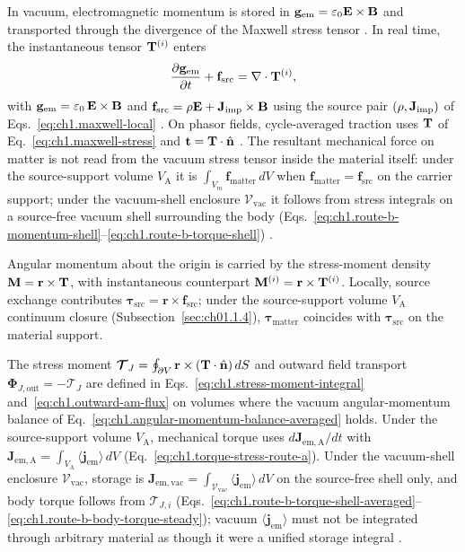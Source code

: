 In vacuum, electromagnetic momentum is stored in $\mathbf{g}_{\mathrm{em}}=\varepsilon_0\mathbf{E}\times\mathbf{B}$ and transported through the divergence of the Maxwell stress tensor \cite{maxwell1873,stratton1941}. In real time, the instantaneous tensor $\mathbf{T}^{(i)}$ enters
\begin{equation}
\label{eq:ch1.intro-momentum-balance}
\frac{\partial\mathbf{g}_{\mathrm{em}}}{\partial t}+\mathbf{f}_{\mathrm{src}}
=\nabla\cdot\mathbf{T}^{(i)},
\end{equation}
with $\mathbf{g}_{\mathrm{em}}=\varepsilon_0\,\mathbf{E}\times\mathbf{B}$ and $\mathbf{f}_{\mathrm{src}}=\rho\mathbf{E}+\mathbf{J}_{\mathrm{imp}}\times\mathbf{B}$ using the source pair $(\rho,\mathbf{J}_{\mathrm{imp}})$ of Eqs.~\eqref{eq:ch1.maxwell-local} \cite{maxwell1873,stratton1941}. On phasor fields, cycle-averaged traction uses $\mathbf{T}$ of Eq.~\eqref{eq:ch1.maxwell-stress} and $\mathbf{t}=\mathbf{T}\cdot\hat{\mathbf{n}}$ \cite{stratton1941}. The resultant mechanical force on matter is not read from the vacuum stress tensor inside the material itself: under the source-support volume $V_{\mathrm{A}}$ it is $\int_{V_m}\mathbf{f}_{\mathrm{matter}}\,dV$ when $\mathbf{f}_{\mathrm{matter}}=\mathbf{f}_{\mathrm{src}}$ on the carrier support; under the vacuum-shell enclosure $\mathcal{V}_{\mathrm{vac}}$ it follows from stress integrals on a source-free vacuum shell surrounding the body (Eqs.~\eqref{eq:ch1.route-b-momentum-shell}--\eqref{eq:ch1.route-b-torque-shell}) \cite{stratton1941,harrington2001}.

Angular momentum about the origin is carried by the stress-moment density $\mathbf{M}=\mathbf{r}\times\mathbf{T}$, with instantaneous counterpart $\mathbf{M}^{(i)}=\mathbf{r}\times\mathbf{T}^{(i)}$. Locally, source exchange contributes $\boldsymbol{\tau}_{\mathrm{src}}=\mathbf{r}\times\mathbf{f}_{\mathrm{src}}$; under the source-support volume $V_{\mathrm{A}}$ continuum closure (Subsection~\ref{sec:ch01.1.4}), $\boldsymbol{\tau}_{\mathrm{matter}}$ coincides with $\boldsymbol{\tau}_{\mathrm{src}}$ on the material support.

The stress moment $\boldsymbol{\mathcal{T}}_J=\oint_{\partial V}\mathbf{r}\times(\mathbf{T}\cdot\hat{\mathbf{n}})\,dS$ and outward field transport $\boldsymbol{\Phi}_{J,\mathrm{out}}=-\boldsymbol{\mathcal{T}}_J$ are defined in Eqs.~\eqref{eq:ch1.stress-moment-integral} and~\eqref{eq:ch1.outward-am-flux} on volumes where the vacuum angular-momentum balance of Eq.~\eqref{eq:ch1.angular-momentum-balance-averaged} holds. Under the source-support volume $V_{\mathrm{A}}$, mechanical torque uses $d\mathbf{J}_{\mathrm{em,A}}/dt$ with $\mathbf{J}_{\mathrm{em,A}}=\int_{V_{\mathrm{A}}}\langle\mathbf{j}_{\mathrm{em}}\rangle\,dV$ (Eq.~\eqref{eq:ch1.torque-stress-route-a}). Under the vacuum-shell enclosure $\mathcal{V}_{\mathrm{vac}}$, storage is $\mathbf{J}_{\mathrm{em,vac}}=\int_{\mathcal{V}_{\mathrm{vac}}}\langle\mathbf{j}_{\mathrm{em}}\rangle\,dV$ on the source-free shell only, and body torque follows from $\boldsymbol{\mathcal{T}}_{J,i}$ (Eqs.~\eqref{eq:ch1.route-b-torque-shell-averaged}--\eqref{eq:ch1.route-b-body-torque-steady}); vacuum $\langle\mathbf{j}_{\mathrm{em}}\rangle$ must not be integrated through arbitrary material as though it were a unified storage integral \cite{beth1936,stratton1941,harrington2001}.

